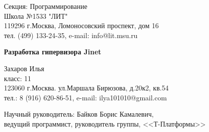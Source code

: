 \documentclass[a4paper,12pt]{extarticle}
\begin{document}
	Секция: Программирование\\
	Школа №1533 "ЛИТ"\\
	119296 г.Москва, Ломоносовский проспект, дом 16\\
	тел. (499) 133-24-35, e-mail: info@lit.msu.ru\par
	{\Large \textbf{Разработка гипервизора Jinet}}\par
	Захаров Илья\\
	класс: 11\\
	123060 г.Москва. ул.Маршала Бирюзова, д.20к2, кв.54\\
	тел.: 8 (916) 620-86-51, e-mail: ilya101010@gmail.com\par
	Научный руководитель: Байков Борис Камалевич,\\ ведущий программист, руководитель группы, <<Т-Платформы>>
	\\\par
	
\end{document}
